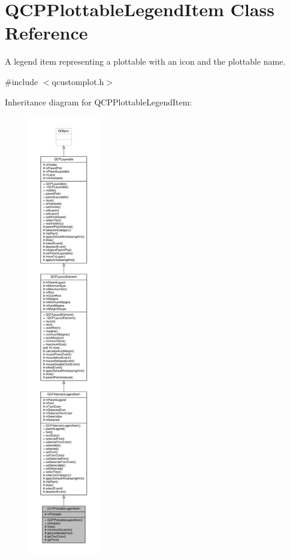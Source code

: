 \hypertarget{class_q_c_p_plottable_legend_item}{}\section{Q\+C\+P\+Plottable\+Legend\+Item Class Reference}
\label{class_q_c_p_plottable_legend_item}


A legend item representing a plottable with an icon and the plottable name.  




{\ttfamily \#include $<$qcustomplot.\+h$>$}



Inheritance diagram for Q\+C\+P\+Plottable\+Legend\+Item\+:\nopagebreak
\begin{figure}[H]
\begin{center}
\leavevmode
\includegraphics[height=550pt]{class_q_c_p_plottable_legend_item__inherit__graph}
\end{center}
\end{figure}


